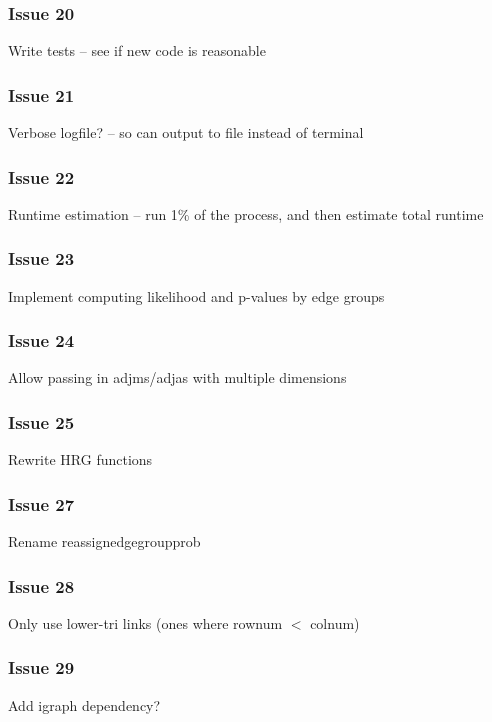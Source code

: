 \documentclass[11pt]{article}
\begin{document}
\subsubsection*{Issue 20}
Write tests -- see if new code is reasonable

\subsubsection*{Issue 21}
Verbose logfile? -- so can output to file instead of terminal

\subsubsection*{Issue 22}
Runtime estimation -- run 1\% of the process, and then estimate total runtime

\subsubsection*{Issue 23}
Implement computing likelihood and p-values by edge groups

\subsubsection*{Issue 24}
Allow passing in adjms/adjas with multiple dimensions

\subsubsection*{Issue 25}
Rewrite HRG functions

\subsubsection*{Issue 27}
Rename reassignedgegroupprob

\subsubsection*{Issue 28}
Only use lower-tri links (ones where rownum $<$ colnum)

\subsubsection*{Issue 29}
Add igraph dependency?

\end{document}
